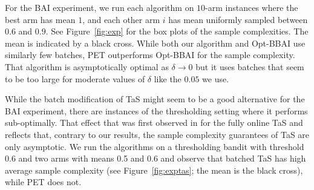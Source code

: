 For the BAI experiment, we run each algorithm on $10$-arm instances where the best arm has mean $1$, and each other arm $i$ has mean uniformly sampled between $0.6$ and $0.9$.
See Figure~\ref{fig:exp} for the box plots of the sample complexities. The mean is indicated by a black cross.
While both our algorithm and Opt-BBAI use similarly few batches, PET outperforms Opt-BBAI for the sample complexity.
That algorithm is asymptotically optimal as $\delta\rightarrow 0$ but it uses batches that seem to be too large for moderate values of $\delta$ like the $0.05$ we use.

While the batch modification of TaS might seem to be a good alternative for the BAI experiment, there are instances of the thresholding setting where it performs sub-optimally.
That effect that was first observed in \citep{degenneNonAsymptoticPureExploration2019} for the fully online TaS and reflects that, contrary to our results, the sample complexity guarantees of TaS are only asymptotic. 
We run the algorithms on a thresholding bandit with threshold 0.6 and two arms with means 0.5 and 0.6 and observe that batched TaS has high average sample complexity (see Figure~\ref{fig:exptas}; the mean is the black cross), while PET does not.




